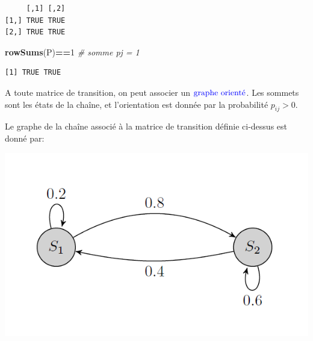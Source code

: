 \documentclass[
]{book}
\newenvironment{Shaded}{\begin{snugshade}}{\end{snugshade}}
\newcommand{\CommentTok}[1]{\textcolor[rgb]{0.56,0.35,0.01}{\textit{#1}}}
\newcommand{\DecValTok}[1]{\textcolor[rgb]{0.00,0.00,0.81}{#1}}
\newcommand{\KeywordTok}[1]{\textcolor[rgb]{0.13,0.29,0.53}{\textbf{#1}}}
\newcommand{\NormalTok}[1]{#1}
\newcommand{\OperatorTok}[1]{\textcolor[rgb]{0.81,0.36,0.00}{\textbf{#1}}}
\theoremstyle{definition}
\theoremstyle{definition}
\theoremstyle{definition}
\theoremstyle{remark}
\begin{document}
\begin{verbatim}
     [,1] [,2]
[1,] TRUE TRUE
[2,] TRUE TRUE
\end{verbatim}

\begin{Shaded}
\begin{Highlighting}[]
\KeywordTok{rowSums}\NormalTok{(P)}\OperatorTok{==}\DecValTok{1} \CommentTok{# somme pj = 1}
\end{Highlighting}
\end{Shaded}

\begin{verbatim}
[1] TRUE TRUE
\end{verbatim}

A toute matrice de transition, on peut associer un \(\color{blue}{\mathbf{\text{graphe orienté}}}\). Les sommets sont les états de la chaîne, et l'orientation est donnée par la probabilité \(p_{ij}>0\).

Le graphe de la chaîne associé à la matrice de transition définie ci-dessus est donné par:

\begin{center}\includegraphics[width=8.36in]{images/graph1} \end{center}
\end{document}
